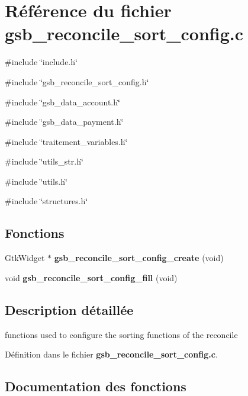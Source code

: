 \section{Référence du fichier gsb\_\-reconcile\_\-sort\_\-config.c}
\label{gsb__reconcile__sort__config_8c}
{\ttfamily \#include \char`\"{}include.h\char`\"{}}\par
{\ttfamily \#include \char`\"{}gsb\_\-reconcile\_\-sort\_\-config.h\char`\"{}}\par
{\ttfamily \#include \char`\"{}gsb\_\-data\_\-account.h\char`\"{}}\par
{\ttfamily \#include \char`\"{}gsb\_\-data\_\-payment.h\char`\"{}}\par
{\ttfamily \#include \char`\"{}traitement\_\-variables.h\char`\"{}}\par
{\ttfamily \#include \char`\"{}utils\_\-str.h\char`\"{}}\par
{\ttfamily \#include \char`\"{}utils.h\char`\"{}}\par
{\ttfamily \#include \char`\"{}structures.h\char`\"{}}\par
\subsection*{Fonctions}
\begin{DoxyCompactItemize}
\item 
GtkWidget $\ast$ {\bf gsb\_\-reconcile\_\-sort\_\-config\_\-create} (void)
\item 
void {\bf gsb\_\-reconcile\_\-sort\_\-config\_\-fill} (void)
\end{DoxyCompactItemize}


\subsection{Description détaillée}
functions used to configure the sorting functions of the reconcile 

Définition dans le fichier {\bf gsb\_\-reconcile\_\-sort\_\-config.c}.



\subsection{Documentation des fonctions}
